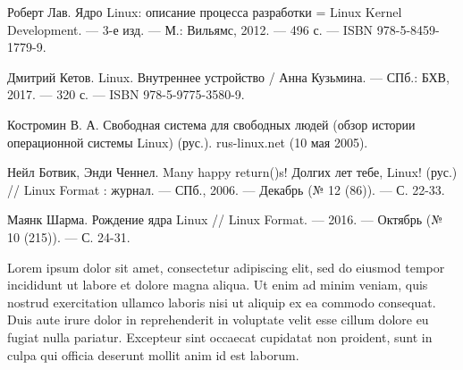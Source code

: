 




\begin{thebibliography}{99}
Роберт Лав. Ядро Linux: описание процесса разработки = Linux Kernel Development. — 3-е изд. — М.: Вильямс, 2012. — 496 с. — ISBN 978-5-8459-1779-9.

Дмитрий Кетов. Linux. Внутреннее устройство / Анна Кузьмина. — СПб.: БХВ, 2017. — 320 с. — ISBN 978-5-9775-3580-9.

Костромин В. А. Свободная система для свободных людей (обзор истории операционной системы Linux) (рус.). rus-linux.net (10 мая 2005).

Нейл Ботвик, Энди Ченнел. Many happy return()s! Долгих лет тебе, Linux! (рус.) // Linux Format : журнал. — СПб., 2006. — Декабрь (№ 12 (86)). — С. 22-33.

Маянк Шарма. Рождение ядра Linux // Linux Format. — 2016. — Октябрь (№ 10 (215)). — С. 24-31.


\newpage
{

Lorem ipsum dolor sit amet, consectetur adipiscing elit, sed do eiusmod tempor incididunt ut labore et dolore magna aliqua. Ut enim ad minim veniam, quis nostrud exercitation ullamco laboris nisi ut aliquip ex ea commodo consequat. Duis aute irure dolor in reprehenderit in voluptate velit esse cillum dolore eu fugiat nulla pariatur. Excepteur sint occaecat cupidatat non proident, sunt in culpa qui officia deserunt mollit anim id est laborum.
}
\end{thebibliography}

